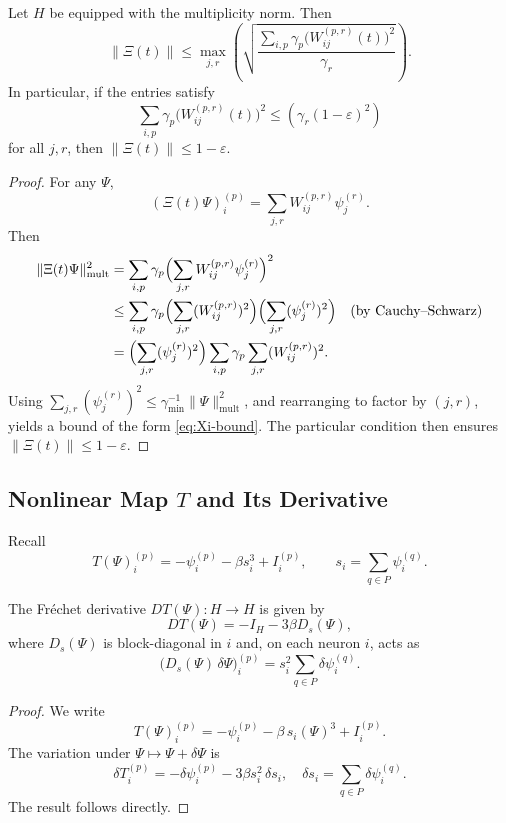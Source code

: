 \documentclass[11pt]{article}
\begin{document}
\begin{lemma}
\label{lem:Xi-bound}
Let \(H\) be equipped with the multiplicity norm.
Then
\begin{equation}
\label{eq:Xi-bound}
\|\Xi(t)\|
\le \max_{j,r}\left(
  \sqrt{\frac{\sum_{i,p} \gamma_p \bigl(W_{ij}^{(p,r)}(t)\bigr)^2}{\gamma_r}}
\right).
\end{equation}
In particular, if the entries satisfy
\[
\sum_{i,p} \gamma_p \bigl(W_{ij}^{(p,r)}(t)\bigr)^2
\le (\gamma_r (1-\varepsilon)^2)
\]
for all \(j,r\), then \(\|\Xi(t)\|\le 1-\varepsilon\).
\end{lemma}

\begin{proof}
For any \(\Psi\),
\[
(\Xi(t)\Psi)_i^{(p)} = \sum_{j,r} W_{ij}^{(p,r)}\psi_j^{(r)}.
\]
Then
\[
\begin{aligned}
\|\Xi(t)\Psi\|_{\mathrm{mult}}^2
&= \sum_{i,p} \gamma_p \Bigl(\sum_{j,r} W_{ij}^{(p,r)}\psi_j^{(r)}\Bigr)^2 \\
&\le \sum_{i,p} \gamma_p \Bigl(\sum_{j,r} (W_{ij}^{(p,r)})^2\Bigr)\Bigl(\sum_{j,r} (\psi_j^{(r)})^2\Bigr)
\quad\text{(by Cauchy--Schwarz)} \\
&= \Bigl(\sum_{j,r} (\psi_j^{(r)})^2\Bigr)
   \sum_{i,p}\gamma_p \sum_{j,r} (W_{ij}^{(p,r)})^2.
\end{aligned}
\]
Using \(\sum_{j,r}(\psi_j^{(r)})^2 \le \gamma_{\min}^{-1}\|\Psi\|_{\mathrm{mult}}^2\), and rearranging to factor by \((j,r)\), yields a bound of the form \eqref{eq:Xi-bound}.
The particular condition then ensures \(\|\Xi(t)\|\le 1-\varepsilon\).
\end{proof}

\subsection{Nonlinear Map \(T\) and Its Derivative}

Recall
\[
T(\Psi)_i^{(p)} = -\psi_i^{(p)} - \beta s_i^3 + I_i^{(p)},
\qquad s_i = \sum_{q\in P}\psi_i^{(q)}.
\]

\begin{lemma}[Derivative of \(T\)]
\label{lem:DT-expression}
The Fréchet derivative \(DT(\Psi):H\to H\) is given by
\[
DT(\Psi) = -I_H - 3\beta D_s(\Psi),
\]
where \(D_s(\Psi)\) is block-diagonal in \(i\) and, on each neuron \(i\), acts as
\[
\bigl(D_s(\Psi)\,\delta\Psi\bigr)_i^{(p)}
= s_i^2 \sum_{q\in P} \delta\psi_i^{(q)}.
\]
\end{lemma}

\begin{proof}
We write
\[
T(\Psi)_i^{(p)}
= -\psi_i^{(p)} - \beta \, s_i(\Psi)^3 + I_i^{(p)}.
\]
The variation under \(\Psi \mapsto \Psi + \delta\Psi\) is
\[
\delta T_i^{(p)}
= -\delta\psi_i^{(p)} - 3\beta s_i^2\,\delta s_i,
\quad
\delta s_i = \sum_{q\in P} \delta\psi_i^{(q)}.
\]
The result follows directly.
\end{proof}
\end{document}
